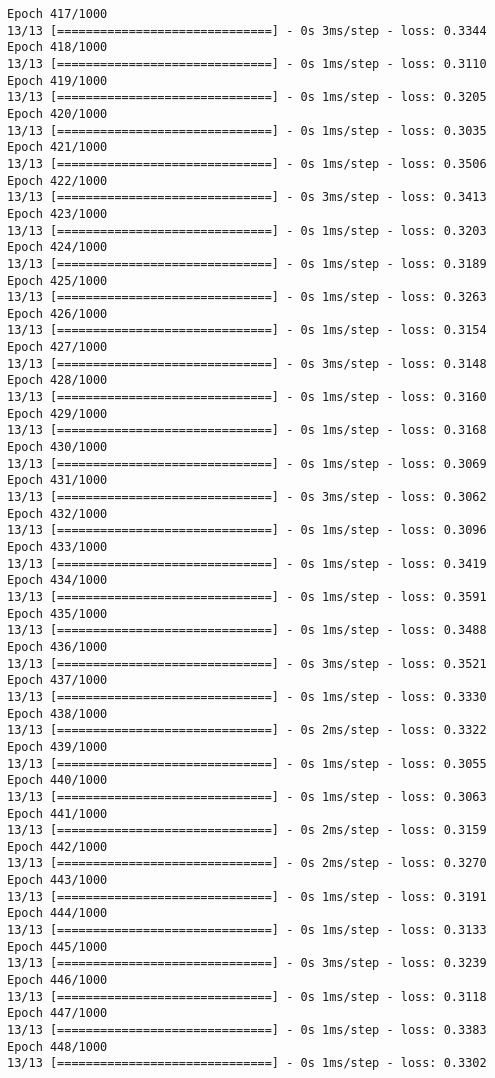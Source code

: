\documentclass[11pt]{article}
\begin{document}
\begin{Verbatim}[commandchars=\\\{\}]
Epoch 417/1000
13/13 [==============================] - 0s 3ms/step - loss: 0.3344
Epoch 418/1000
13/13 [==============================] - 0s 1ms/step - loss: 0.3110
Epoch 419/1000
13/13 [==============================] - 0s 1ms/step - loss: 0.3205
Epoch 420/1000
13/13 [==============================] - 0s 1ms/step - loss: 0.3035
Epoch 421/1000
13/13 [==============================] - 0s 1ms/step - loss: 0.3506
Epoch 422/1000
13/13 [==============================] - 0s 3ms/step - loss: 0.3413
Epoch 423/1000
13/13 [==============================] - 0s 1ms/step - loss: 0.3203
Epoch 424/1000
13/13 [==============================] - 0s 1ms/step - loss: 0.3189
Epoch 425/1000
13/13 [==============================] - 0s 1ms/step - loss: 0.3263
Epoch 426/1000
13/13 [==============================] - 0s 1ms/step - loss: 0.3154
Epoch 427/1000
13/13 [==============================] - 0s 3ms/step - loss: 0.3148
Epoch 428/1000
13/13 [==============================] - 0s 1ms/step - loss: 0.3160
Epoch 429/1000
13/13 [==============================] - 0s 1ms/step - loss: 0.3168
Epoch 430/1000
13/13 [==============================] - 0s 1ms/step - loss: 0.3069
Epoch 431/1000
13/13 [==============================] - 0s 3ms/step - loss: 0.3062
Epoch 432/1000
13/13 [==============================] - 0s 1ms/step - loss: 0.3096
Epoch 433/1000
13/13 [==============================] - 0s 1ms/step - loss: 0.3419
Epoch 434/1000
13/13 [==============================] - 0s 1ms/step - loss: 0.3591
Epoch 435/1000
13/13 [==============================] - 0s 1ms/step - loss: 0.3488
Epoch 436/1000
13/13 [==============================] - 0s 3ms/step - loss: 0.3521
Epoch 437/1000
13/13 [==============================] - 0s 1ms/step - loss: 0.3330
Epoch 438/1000
13/13 [==============================] - 0s 2ms/step - loss: 0.3322
Epoch 439/1000
13/13 [==============================] - 0s 1ms/step - loss: 0.3055
Epoch 440/1000
13/13 [==============================] - 0s 1ms/step - loss: 0.3063
Epoch 441/1000
13/13 [==============================] - 0s 2ms/step - loss: 0.3159
Epoch 442/1000
13/13 [==============================] - 0s 2ms/step - loss: 0.3270
Epoch 443/1000
13/13 [==============================] - 0s 1ms/step - loss: 0.3191
Epoch 444/1000
13/13 [==============================] - 0s 1ms/step - loss: 0.3133
Epoch 445/1000
13/13 [==============================] - 0s 3ms/step - loss: 0.3239
Epoch 446/1000
13/13 [==============================] - 0s 1ms/step - loss: 0.3118
Epoch 447/1000
13/13 [==============================] - 0s 1ms/step - loss: 0.3383
Epoch 448/1000
13/13 [==============================] - 0s 1ms/step - loss: 0.3302

\end{Verbatim}
\end{document}
